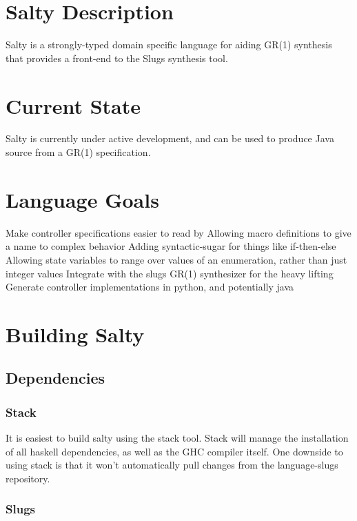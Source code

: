 
\section{Salty Description}

Salty is a strongly-typed domain specific language for aiding GR(1) synthesis that provides a front-end to the Slugs synthesis tool. 

\section{Current State}

Salty is currently under active development, and can be used to produce Java source from a GR(1) specification.

\section{Language Goals}

Make controller specifications easier to read by
Allowing macro definitions to give a name to complex behavior
Adding syntactic-sugar for things like if-then-else
Allowing state variables to range over values of an enumeration, rather than just integer values
Integrate with the slugs GR(1) synthesizer for the heavy lifting
Generate controller implementations in python, and potentially java

\section{Building Salty}

\subsection{Dependencies}

\subsubsection{Stack}

It is easiest to build salty using the stack tool. Stack will manage the installation of all haskell dependencies, as well as the GHC compiler itself. One downside to using stack is that it won't automatically pull changes from the language-slugs repository.

\subsubsection{Slugs}

